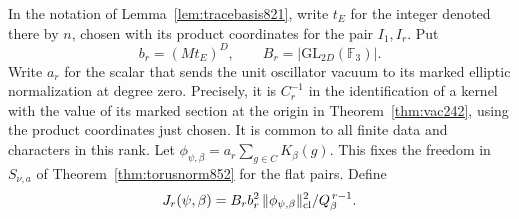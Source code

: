 \documentclass[a4paper,11pt]{article}
\theoremstyle{definition}
\theoremstyle{remark}
\numberwithin{equation}{section}
\begin{document}
In the notation of Lemma~\ref{lem:tracebasis821}, write \(t_E\)
for the integer denoted there by \(n\), chosen with its product
coordinates for the pair \(I_1,I_r\). Put
\[
 b_r=(M t_E)^D,\qquad
 B_r=|\mathrm{GL}_{2D}(\mathbb F_3)|.
\]
Write \(a_r\) for the scalar that sends the unit oscillator
vacuum to its marked elliptic normalization at degree zero.
Precisely, it is \(C_r^{-1}\) in the identification of a kernel
with the value of its marked section at the origin in
Theorem~\ref{thm:vac242}, using the product coordinates just
chosen. It is common to all finite data and characters in
this rank. Let \(\phi_{\psi,\beta}=a_r\sum_{g\in C}K_\beta(g)\).
This fixes the freedom in \(S_{\nu,a}\) of
Theorem~\ref{thm:torusnorm852} for the flat pairs. Define
\[
        J_r(\psi,\beta)=
         B_r b_r^2\,\|\phi_{\psi,\beta}\|_{\rm cl}^2/
                                      Q_\beta^{\,r-1}.
\]
\end{document}
